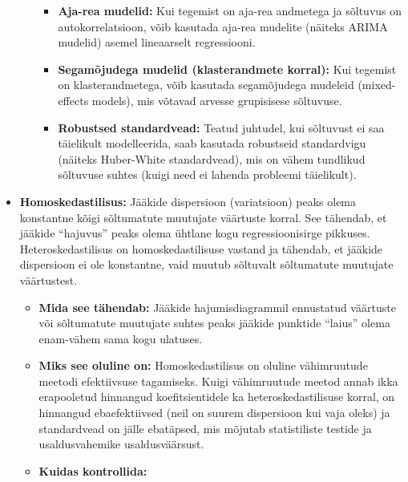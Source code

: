 \documentclass[
]{book}
\providecommand{\tightlist}{%
  \setlength{\itemsep}{0pt}\setlength{\parskip}{0pt}}
\begin{document}
\begin{itemize}
\begin{itemize}
    \begin{itemize}
    \tightlist
    \item
      \textbf{Aja-rea mudelid:} Kui tegemist on aja-rea andmetega ja sõltuvus on autokorrelatsioon, võib kasutada aja-rea mudelite (näiteks ARIMA mudelid) asemel lineaarselt regressiooni.
    \item
      \textbf{Segamõjudega mudelid (klasterandmete korral):} Kui tegemist on klasterandmetega, võib kasutada segamõjudega mudeleid (mixed-effects models), mis võtavad arvesse grupisisese sõltuvuse.
    \item
      \textbf{Robustsed standardvead:} Teatud juhtudel, kui sõltuvust ei saa täielikult modelleerida, saab kasutada robustseid standardvigu (näiteks Huber-White standardvead), mis on vähem tundlikud sõltuvuse suhtes (kuigi need ei lahenda probleemi täielikult).
    \end{itemize}
  \end{itemize}
\item
  \textbf{Homoskedastilisus:} Jääkide dispersioon (variatsioon) peaks olema konstantne kõigi sõltumatute muutujate väärtuste korral. See tähendab, et jääkide ``hajuvus'' peaks olema ühtlane kogu regressioonisirge pikkuses. Heteroskedastilisus on homoskedastilisuse vastand ja tähendab, et jääkide dispersioon ei ole konstantne, vaid muutub sõltuvalt sõltumatute muutujate väärtustest.

  \begin{itemize}
  \tightlist
  \item
    \textbf{Mida see tähendab:} Jääkide hajumisdiagrammil ennustatud väärtuste või sõltumatute muutujate suhtes peaks jääkide punktide ``laius'' olema enam-vähem sama kogu ulatuses.
  \item
    \textbf{Miks see oluline on:} Homoskedastilisus on oluline vähimruutude meetodi efektiivsuse tagamiseks. Kuigi vähimruutude meetod annab ikka erapooletud hinnangud koefitsientidele ka heteroskedastilisuse korral, on hinnangud ebaefektiivsed (neil on suurem dispersioon kui vaja oleks) ja standardvead on jälle ebatäpsed, mis mõjutab statistiliste testide ja usaldusvahemike usaldusväärsust.
  \item
    \textbf{Kuidas kontrollida:}


\end{itemize}
\end{itemize}
\end{document}
